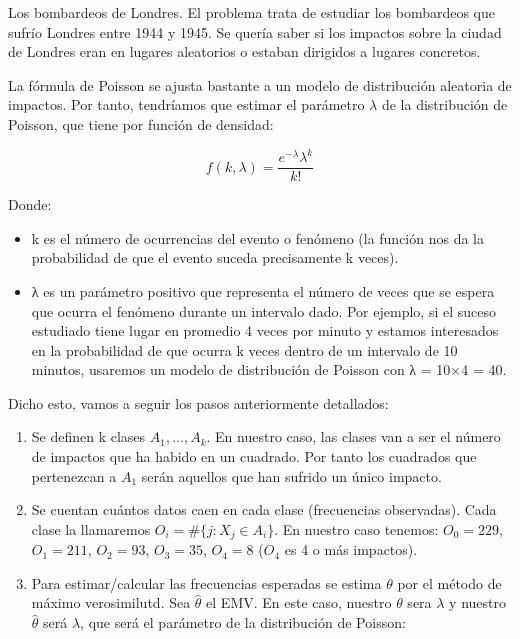 \documentclass[nochap]{apuntes}
\begin{document}
\begin{example}
Los bombardeos de Londres. El problema trata de estudiar los bombardeos que sufrío Londres entre 1944 y 1945. Se quería saber si los impactos sobre la ciudad de Londres eran en lugares aleatorios o estaban dirigidos a lugares concretos.

La fórmula de Poisson se ajusta bastante a un modelo de distribución aleatoria de impactos. Por tanto, tendríamos que estimar el parámetro $\lambda$ de la distribución de Poisson, que tiene por función de densidad:

$$ f(k,\lambda)=\frac{e^{-\lambda}\lambda^k}{k!} $$

Donde:
\begin{itemize}
\item k es el número de ocurrencias del evento o fenómeno (la función nos da la probabilidad de que el evento suceda precisamente k veces).

\item λ es un parámetro positivo que representa el número de veces que se espera que ocurra el fenómeno durante un intervalo dado. Por ejemplo, si el suceso estudiado tiene lugar en promedio 4 veces por minuto y estamos interesados en la probabilidad de que ocurra k veces dentro de un intervalo de 10 minutos, usaremos un modelo de distribución de Poisson con λ = 10×4 = 40.
\end{itemize} 
Dicho esto, vamos a seguir los pasos anteriormente detallados:



\begin{enumerate}
\item Se definen k clases $A_1,...,A_k$. En nuestro caso, las clases van a ser el número de impactos que ha habido en un cuadrado. Por tanto los cuadrados que pertenezcan a $A_1$ serán aquellos que han sufrido un único impacto.

\item Se cuentan cuántos datos caen en cada clase (frecuencias observadas). Cada clase la llamaremos $O_i=\#\{j:X_j\in A_i\}$. En nuestro caso tenemos: $O_0=229$, $O_1=211$, $O_2=93$, $O_3=35$, $O_4=8$ ($O_4$ es 4 o más impactos).


\item Para estimar/calcular las frecuencias esperadas se estima $\theta$ por el método de máximo verosimilutd. Sea $\hat{\theta}$ el EMV. En este caso, nuestro $\theta$ sera $\lambda$ y nuestro $\hat{\theta}$ será $\hat{\lambda}$, que será el parámetro de la distribución de Poisson:


\end{enumerate}
\end{example}
\end{document}

